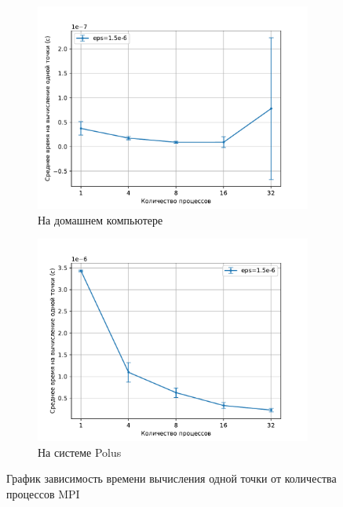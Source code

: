 \documentclass{article}
\begin{document}
        \clearpage
\begin{figure}[!t]
\centering
\begin{subfigure}[b]{0.49\textwidth}
    \centering
    \includegraphics[width=\textwidth,trim=0 0 0 0,clip]{1.5e-6_home_pc_time_pp.pdf}
    \caption{На домашнем компьютере}
    \label{img:1.1}
\end{subfigure}
\begin{subfigure}[b]{0.49\textwidth}
    \centering
    \includegraphics[width=\textwidth,trim=0 0 0 0,clip]{1.5e-6_polus_time_pp.pdf}
    \caption{На системе Polus}
    \label{img:1.2}
\end{subfigure}
\caption{График зависимость времени вычисления одной точки от количества процессов MPI}
\end{figure}
\end{document}
